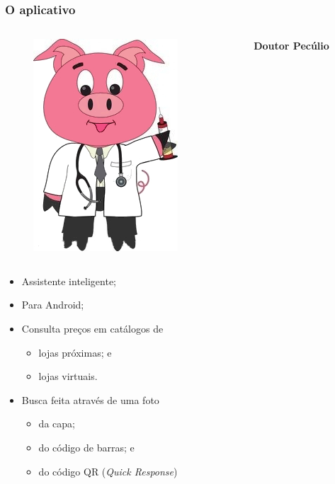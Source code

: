 \documentclass[14pt,beamer]{beamer}
\begin{document}
\begin{frame}
	\frametitle{O aplicativo}
    
	\vspace{-30px}
	\begin{columns}
		\begin{column}{.3\textwidth}
			\begin{figure}
				\includegraphics[scale=.15]{imagens/docpig}
			\end{figure}
		\end{column}%
		\hfill%
		\begin{column}{9\textwidth}
			\large{\textbf{Doutor Pecúlio}}
		\end{column}%
	\end{columns}
	
	\vspace{10px}
	\begin{itemize}
        \item Assistente inteligente;
        \item Para Android;
		\item Consulta preços em catálogos de
			\begin{itemize}
				\item lojas próximas; e
				\item lojas virtuais. 	
			\end{itemize}
		\item Busca feita através de uma foto
			\begin{itemize}
				\item da capa;
				\item do código de barras; e
                \item do código QR (\emph{Quick Response})
			\end{itemize}
	\end{itemize}
\end{frame}
\end{document}
